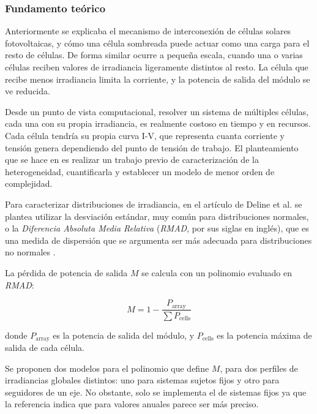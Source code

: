 \subsubsection{Fundamento teórico}

Anteriormente se explicaba el mecanismo de interconexión de células solares fotovoltaicas, y cómo una célula sombreada puede actuar como una carga para el resto de células. De forma similar ocurre a pequeña escala, cuando una o varias células reciben valores de irradiancia ligeramente distintos al resto. La célula que recibe menos irradiancia limita la corriente, y la potencia de salida del módulo se ve reducida.

Desde un punto de vista computacional, resolver un sistema de múltiples células, cada una con su propia irradiancia, es realmente costoso en tiempo y en recursos. Cada célula tendría su propia curva I-V, que representa cuanta corriente y tensión genera dependiendo del punto de tensión de trabajo. El planteamiento que se hace en \cite{Deline_Ayala_Pelaez_MacAlpine_Olalla_2020} es realizar un trabajo previo de caracterización de la heterogeneidad, cuantificarla y establecer un modelo de menor orden de complejidad.

Para caracterizar distribuciones de irradiancia, en el artículo de Deline et al. \cite{Deline_Ayala_Pelaez_MacAlpine_Olalla_2020} se plantea utilizar la desviación estándar, muy común para distribuciones normales, o la \textit{Diferencia Absoluta Media Relativa} (\textit{RMAD}, por sus siglas en inglés), que es una medida de dispersión que se argumenta ser más adecuada para distribuciones no normales \cite{Ginis_mean_difference_2003}.

La pérdida de potencia de salida $M$ se calcula con un polinomio evaluado en \textit{RMAD}:

\begin{equation} \label{eq:perdidas_heterogeneidad}
    M = 1 - \frac{P_\text{array}}{\sum P_\text{cells}}
\end{equation}

donde $P_\text{array}$ es la potencia de salida del módulo, y $P_\text{cells}$ es la potencia máxima de salida de cada célula.

Se proponen dos modelos para el polinomio que define $M$, para dos perfiles de irradiancias globales distintos: uno para sistemas sujetos fijos y otro para seguidores de un eje. No obstante, solo se implementa el de sistemas fijos ya que la referencia indica que para valores anuales parece ser más preciso.

